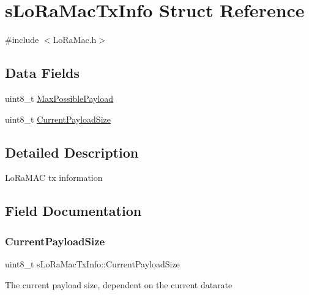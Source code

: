 \hypertarget{structsLoRaMacTxInfo}{}\section{s\+Lo\+Ra\+Mac\+Tx\+Info Struct Reference}
\label{structsLoRaMacTxInfo}


{\ttfamily \#include $<$Lo\+Ra\+Mac.\+h$>$}

\subsection*{Data Fields}
\begin{DoxyCompactItemize}
\item 
uint8\+\_\+t \hyperlink{structsLoRaMacTxInfo_a4b505a1e389e4a511a45769eb4a06e53}{Max\+Possible\+Payload}
\item 
uint8\+\_\+t \hyperlink{structsLoRaMacTxInfo_a7196efc2a607d83aa46c1001831e89f3}{Current\+Payload\+Size}
\end{DoxyCompactItemize}


\subsection{Detailed Description}
Lo\+Ra\+M\+AC tx information 

\subsection{Field Documentation}
\mbox{\label{structsLoRaMacTxInfo_a7196efc2a607d83aa46c1001831e89f3}} 
\subsubsection{\texorpdfstring{Current\+Payload\+Size}{CurrentPayloadSize}}
{\footnotesize\ttfamily uint8\+\_\+t s\+Lo\+Ra\+Mac\+Tx\+Info\+::\+Current\+Payload\+Size}

The current payload size, dependent on the current datarate \mbox{\label{structsLoRaMacTxInfo_a4b505a1e389e4a511a45769eb4a06e53}} 
